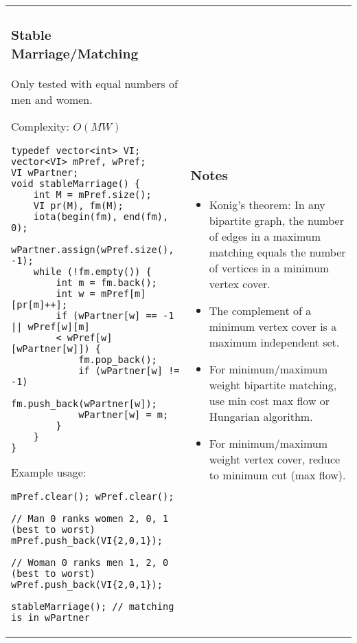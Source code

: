 \documentclass[letterpaper]{article}
\begin{document}
\vspace{-3em}
\begin{tabular}{@{}p{9cm}p{9cm}@{}}
\subsubsection{Stable Marriage/Matching}

Only tested with equal numbers of men and women.

Complexity: $O\left(MW\right)$

\begin{lstlisting}
typedef vector<int> VI;
vector<VI> mPref, wPref;
VI wPartner;
void stableMarriage() {
	int M = mPref.size();
	VI pr(M), fm(M);
	iota(begin(fm), end(fm), 0);
	wPartner.assign(wPref.size(), -1);
	while (!fm.empty()) {
		int m = fm.back();
		int w = mPref[m][pr[m]++];
		if (wPartner[w] == -1 || wPref[w][m]
		< wPref[w][wPartner[w]]) {
			fm.pop_back();
			if (wPartner[w] != -1)
				fm.push_back(wPartner[w]);
			wPartner[w] = m;
		}
	}
}
\end{lstlisting}

Example usage:
\begin{lstlisting}
mPref.clear(); wPref.clear();

// Man 0 ranks women 2, 0, 1 (best to worst)
mPref.push_back(VI{2,0,1});

// Woman 0 ranks men 1, 2, 0 (best to worst)
wPref.push_back(VI{2,0,1});

stableMarriage(); // matching is in wPartner
\end{lstlisting}
&
\subsubsection{Notes}
\begin{itemize}
\item Konig's theorem: In any bipartite graph, the number of edges in a maximum matching equals the number of vertices in a minimum vertex cover.
\item The complement of a minimum vertex cover is a maximum independent set.
\item For minimum/maximum weight bipartite matching, use min cost max flow or Hungarian algorithm.
\item For minimum/maximum weight vertex cover, reduce to minimum cut (max flow).
\end{itemize}
\end{tabular}

\clearpage
\end{document}
